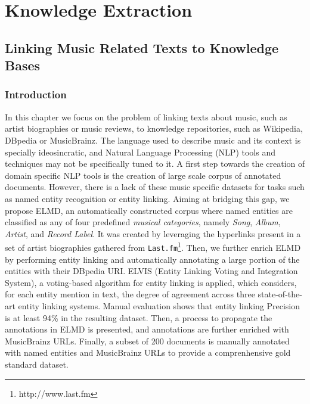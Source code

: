 \part{Knowledge Extraction}
\label{part:knowledge-extraction}

\chapter[Linking Music Related Texts to Knowledge Bases][Linking Music Related Texts to KBs]{Linking Music Related Texts to Knowledge Bases}
\label{sec:linking}


\section{Introduction}
\label{sec:linking:intro}

In this chapter we focus on the problem of linking texts about music, such as artist biographies or music reviews, to knowledge repositories, such as Wikipedia, DBpedia or MusicBrainz. 
The language used to describe music and its context is specially ideosincratic, and Natural Language Processing (NLP) tools and techniques may not be specifically tuned to it. A first step towards the creation of domain specific NLP tools is the creation of large scale corpus of annotated documents.
However, there is a lack of these music specific datasets for tasks such as named entity recognition or entity linking. Aiming at bridging this gap, we propose \textsc{ELMD}, an automatically constructed corpus where named entities are classified as any of four predefined \textit{musical categories}, namely \textit{Song}, \textit{Album}, \textit{Artist}, and \textit{Record Label}. It was created by leveraging the hyperlinks present in a set of artist biographies gathered from \texttt{Last.fm}\footnote{http://www.last.fm}. Then, we further enrich \textsc{ELMD} by performing entity linking and automatically annotating a large portion of the entities with their DBpedia URI. \textsc{ELVIS} (Entity Linking Voting and Integration System), a voting-based algorithm for entity linking is applied, which considers, for each entity mention in text, the degree of agreement across three state-of-the-art entity linking systems. 
Manual evaluation shows that entity linking Precision is at least 94\% in the resulting dataset.
Then, a process to propagate the annotations in \textsc{ELMD} is presented, and annotations are further enriched with MusicBrainz URLs.
Finally, a subset of 200 documents is manually annotated with named entities and MusicBrainz URLs to provide a comprenhensive gold standard dataset. 

